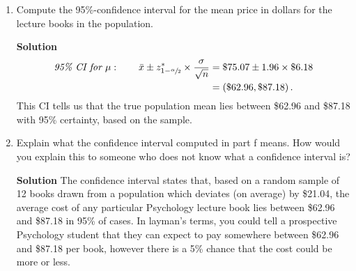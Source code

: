 \begin{enumerate}
\begin{enumerate}
        \item Compute the 95\%-confidence interval for the mean price in dollars for the lecture books in the population.
        \begin{framed}{\textbf{Solution}}
        \begin{align}
            \textit{95\% CI for } \mu : \qquad \bar{x} \pm z^*_{1 - \sfrac{\alpha}{2}} \times \frac{\sigma}{\sqrt{n}} &= \$ 75.07 \pm 1.96 \times \$ 6.18 \\
            &= \left( \$ 62.96, \$ 87.18\right).
        \end{align}
        This CI tells us that the true population mean lies between \$62.96 and \$87.18 with 95\% certainty, based on the sample.
        \end{framed}
        
        \item Explain what the confidence interval computed in part f means. How would you explain this to someone who does not know what a confidence interval is?
        \begin{framed}{\textbf{Solution}}
        The confidence interval states that, based on a random sample of 12 books drawn from a population which deviates (on average) by \$21.04, the average cost of any particular Psychology lecture book lies between \$62.96 and \$87.18 in 95\% of cases. In layman's terms, you could tell a prospective Psychology student that they can expect to pay somewhere between \$62.96 and \$87.18 per book, however there is a 5\% chance that the cost could be more or less.
        \end{framed}
    \end{enumerate}
    

\end{enumerate}
